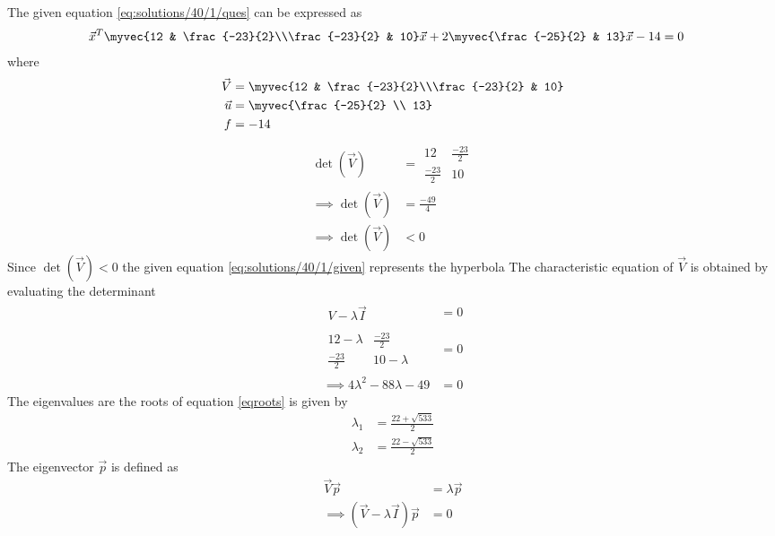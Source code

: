 The given equation \eqref{eq:solutions/40/1/ques} can be expressed as 
\begin{align}
&\vec{x}^T\myvec{12 & \frac{-23}{2}\\\frac{-23}{2} & 10}\vec{x}+2\myvec{\frac{-25}{2} & 13}\vec{x}-14=0\label{eq:solutions/40/1/given}
\end{align}
where 
\begin{align}
\vec{V}&=\myvec{12 & \frac{-23}{2}\\\frac{-23}{2} & 10}\\
\vec{u}&=\myvec{\frac{-25}{2} \\ 13}\\
f&=-14
\end{align}
\begin{align}
    \det(\vec{V})&=\begin{array}{|cc|}
12 & \frac{-23}{2}\\\frac{-23}{2} & 10
\end{array}\\
\implies\det(\vec{V})&=\frac{-49}{4}\\
\implies\det(\vec{V})&<0
\end{align}
Since $\det(\vec{V})<0$ the given equation \eqref{eq:solutions/40/1/given} represents the hyperbola
The characteristic equation of $\vec{V}$ is obtained by evaluating the determinant 
\begin{align}
       \begin{array}{|c|}
V-\lambda\vec{I}
\end{array}&=0\\
   \begin{array}{|cc|}
12-\lambda & \frac{-23}{2} \\ \frac{-23}{2} & 10-\lambda
\end{array}&=0\\
\implies 4\lambda^2-88\lambda-49&=0\label{eq:solutions/40/1/eqroots}
\end{align}
The eigenvalues are the roots of equation \ref{eqroots} is given by 
\begin{align}
    \lambda_1&=\frac{22+\sqrt{533}}{2}\label{eq:solutions/40/1/eqeig1}\\
    \lambda_2&=\frac{22-\sqrt{533}}{2}\label{eq:solutions/40/1/eqeig2}
\end{align}
The eigenvector $\vec{p}$ is defined as 
\begin{align}
    \vec{V}\vec{p}&=\lambda\vec{p}\\
    \implies (\vec{V}-\lambda\vec{I})\vec{p}&=0\label{eq:solutions/40/1/eqev}
\end{align}
